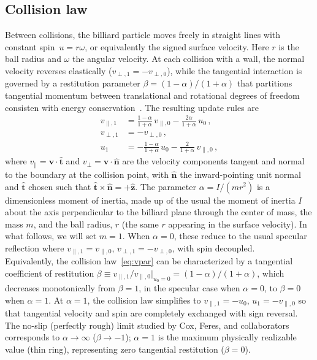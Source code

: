 \documentclass[aps,prd,twocolumn,superscriptaddress,nofootinbib,floatfix]{revtex4-2}
\begin{document}
\subsection{Collision law}
\noindent
Between collisions, the billiard particle moves freely in straight lines with constant spin~$u = r\omega$, or equivalently the signed surface velocity. Here $r$ is the ball radius and $\omega$ the angular velocity. At each collision with a wall, the normal velocity reverses elastically ($v_{\perp,1} = -v_{\perp,0}$), while the tangential interaction is governed by a restitution parameter $\beta = (1-\alpha)/(1+\alpha)$ that partitions tangential momentum between translational and rotational degrees of freedom consisten with energy conservation~\cite{garwin1969,cross2005}. The resulting update rules are
\begin{align}
    v_{\parallel,1} &= \frac{1-\alpha}{1+\alpha}\, v_{\parallel,0} - \frac{2\alpha}{1+\alpha}\, u_0\,,\label{eq:vpar}\\
    v_{\perp,1} &= -v_{\perp,0}\,,\label{eq:vperp}\\
    u_1 &= -\frac{1-\alpha}{1+\alpha}\, u_0 - \frac{2}{1+\alpha}\, v_{\parallel,0}\,,\label{eq:uspin}
\end{align}
where $v_\parallel = \bm{v}\cdot\hat{\bm{t}}$ and $v_\perp = \bm{v}\cdot\hat{\bm{n}}$ are the velocity components tangent and normal to the boundary at the collision point, with $\hat{\bm{n}}$ the inward-pointing unit normal and $\hat{\bm{t}}$ chosen such that $\hat{\bm{t}}\times\hat{\bm{n}} = +\hat{\bm{z}}$. The parameter $\alpha = I/(mr^2)$ is a dimensionless moment of inertia, made up of the usual the moment of inertia $I$ about the axis perpendicular to the billiard plane through the center of mass,  the mass $m$, and the ball radius, $r$ (the same $r$ appearing in the surface velocity). In what follows, we will set $m = 1$. When $\alpha=0$, these reduce to the usual specular reflection where $v_{\parallel,1} = v_{\parallel,0}$, $v_{\perp,1} = -v_{\perp,0}$, with spin decoupled.\\

\noindent
Equivalently, the collision law~\eqref{eq:vpar} can be characterized by a tangential coefficient of restitution $\beta \equiv v_{\parallel,1}/v_{\parallel,0}|_{u_0=0} = (1-\alpha)/(1+\alpha)$, which decreases monotonically from $\beta = 1$, in the specular case when $\alpha=0$, to $\beta = 0$ when $\alpha=1$. At $\alpha = 1$, the collision law simplifies to $v_{\parallel,1} = -u_0$, $u_1 = -v_{\parallel,0}$ so that tangential velocity and spin are completely exchanged with sign reversal. The no-slip (perfectly rough) limit studied by Cox, Feres, and collaborators~\cite{cox2018,cox2022} corresponds to $\alpha \to \infty$ ($\beta \to -1$); $\alpha = 1$ is the maximum physically realizable value (thin ring), representing zero tangential restitution ($\beta = 0$).\\
\end{document}
